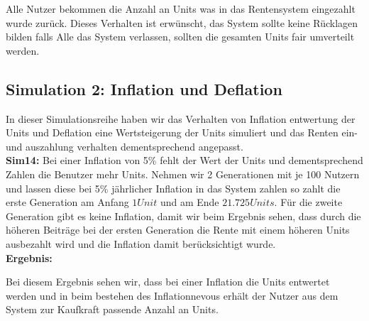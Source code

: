 Alle Nutzer bekommen die Anzahl an Units was in das Rentensystem eingezahlt wurde zurück. Dieses Verhalten ist erwünscht, das System sollte keine Rücklagen bilden falls Alle das System verlassen, sollten die gesamten Units fair umverteilt werden.

\subsection{Simulation 2: Inflation und Deflation}

In dieser Simulationsreihe haben wir das Verhalten von Inflation entwertung der Units und Deflation eine Wertsteigerung der Units simuliert und das Renten ein- und auszahlung verhalten dementsprechend angepasst. \\

\textbf{Sim14:} Bei einer Inflation von 5\% fehlt der Wert der Units und dementsprechend Zahlen die Benutzer mehr Units. Nehmen wir 2 Generationen mit je 100 Nutzern und lassen diese bei 5\% jährlicher Inflation in das System zahlen so zahlt die erste Generation am Anfang $1 Unit$  und am Ende $21.725 Units$. Für die zweite Generation gibt es keine Inflation, damit wir beim Ergebnis sehen, dass durch die höheren Beiträge bei der ersten Generation die Rente mit einem höheren Units ausbezahlt wird und die Inflation damit berücksichtigt wurde. \\

\textbf{Ergebnis:}

\begin{table}[h!]
\centering
{}
\end{table}

Bei diesem Ergebnis sehen wir, dass bei einer Inflation die Units entwertet werden und in beim bestehen des Inflationnevous erhält der Nutzer aus dem System zur Kaufkraft passende Anzahl an Units.

